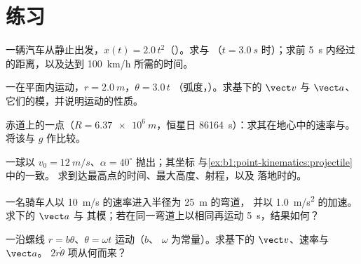 \section{练习}

\begin{exercise}[$\star$]\label{exo:b1:point-kinematics:1}
一辆汽车从静止出发，$x(t) = 2.0\,t^2$（）。求与
（$t = \qty{3.0}{s}$ 时）；求前
\qty{5}{s} 内经过的距离，以及达到 \qty{100}{km/h} 所需的时间。
\end{exercise}

\begin{exercise}[$\star$]\label{exo:b1:point-kinematics:2}
一在平面内运动，$r = \qty{2.0}{m}$，$\theta = 3.0\,t$
（弧度，）。求基下的 $\vect v$ 与 $\vect a$、
它们的模，并说明运动的性质。
\end{exercise}

\begin{exercise}[$\star$]\label{exo:b1:point-kinematics:3}
赤道上的一点（$R = \qty{6.37e6}{m}$，恒星日
\qty{86164}{s}）：求其在地心中的速率与。
将该与 $g$ 作比较。
\end{exercise}

\begin{exercise}[$\star$]\label{exo:b1:point-kinematics:4}
一球以 $v_0 = \qty{12}{m/s}$、$\alpha = 40^\circ$ 抛出；其坐标
与\cref{ex:b1:point-kinematics:projectile}中的一致。
求到达最高点的时间、最大高度、射程，以及
落地时的。
\end{exercise}

\begin{exercise}[$\star\star$]\label{exo:b1:point-kinematics:5}
一名骑车人以 \qty{10}{m/s} 的速率进入半径为 \qty{25}{m} 的弯道，
并以 \qty{1.0}{m/s^2} 的加速。求下的 $\vect a$ 与
其模；若在同一弯道上以相同再运动 \qty{5}{s}，结果如何？
\end{exercise}

\begin{exercise}[$\star\star$]\label{exo:b1:point-kinematics:6}
一沿螺线 $r = b\theta$、$\theta = \omega t$ 运动（$b$、
$\omega$ 为常量）。求基下的 $\vect v$、速率与 $\vect a$。
$2\dot r\dot\theta$ 项从何而来？
\end{exercise}

